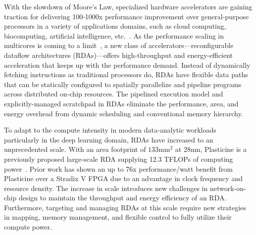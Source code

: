 
With the slowdown of Moore’s Law, specialized hardware accelerators are gaining traction for delivering 100-1000x performance improvement over general-purpose processors in a variety of applications domains, such as cloud computing, biocomputing,
artificial intelligence, etc.~\cite{fpgacloudsurvey,bioaccel,genomicaccel}.
As the performance scaling in multicores is coming to a limit~\cite{multicorescale}, a new class of
accelerators---reconfigurable dataflow architectures (RDAs)---offers high-throughput and energy-efficient acceleration that keeps up with the performance demand.
Instead of dynamically fetching instructions as traditional processors do, RDAs have flexible data paths that can be statically configured to spatially parallelize and pipeline programs across
distributed on-chip resources.
The pipelined execution model and explicitly-managed scratchpad in RDAs eliminate the performance,
area, and energy overhead from dynamic scheduling and conventional memory hierarchy.

To adapt to the compute intensity in modern data-analytic workloads particularly in the deep learning domain, RDAs have increased to an unprecedented scale.
With an area footprint of $133\text{mm}^2$ at 28nm,
Plasticine is a previously proposed large-scale RDA supplying 12.3 TFLOPs of computing power~\cite{plasticine}.
Prior work has shown an up to 76x performance/watt benefit from Plasticine over a Stradix V FPGA
due to an advantage in clock frequency and resource density.
The increase in scale introduces new challenges in network-on-chip design to maintain
the throughput and energy efficiency of an RDA.
Furthermore, targeting and managing RDAs at this scale require new strategies in mapping,  memory management, and flexible control to fully utilize their compute power.

